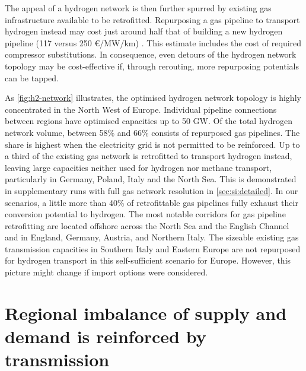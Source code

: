 
The appeal of a hydrogen network is then further spurred by existing gas
infrastructure available to be retrofitted. Repurposing a gas pipeline to
transport hydrogen instead may cost just around half that of building a new
hydrogen pipeline (117 versus 250 \euro/MW/km) \cite{}. This estimate includes
the cost of required compressor substitutions. In consequence, even detours of
the hydrogen network topology may be cost-effective if, through rerouting, more
repurposing potentials can be tapped.


As \cref{fig:h2-network} illustrates, the optimised hydrogen network topology is
highly concentrated in the North West of Europe. Individual pipeline connections
between regions have optimised capacities up to 50 GW. Of the total hydrogen
network volume, between 58\% and 66\% consists of repurposed gas pipelines. The
share is highest when the electricity grid is not permitted to be reinforced. Up
to a third of the existing gas network is retrofitted to transport hydrogen
instead, leaving large capacities neither used for hydrogen nor methane
transport, particularly in Germany, Poland, Italy and the North Sea. This is
demonstrated in supplementary runs with full gas network resolution in
\cref{sec:si:detailed}. In our scenarios, a little more than 40\% of
retrofittable gas pipelines fully exhaust their conversion potential to
hydrogen. The most notable corridors for gas pipeline retrofitting are located
offshore across the North Sea and the English Channel and in England, Germany,
Austria, and Northern Italy. The sizeable existing gas transmission capacities
in Southern Italy and Eastern Europe are not repurposed for hydrogen transport
in this self-sufficient scenario for Europe. However, this picture might change
if import options were considered.



\section*{Regional imbalance of supply and demand is reinforced by transmission}
\label{sec:imbalance}

